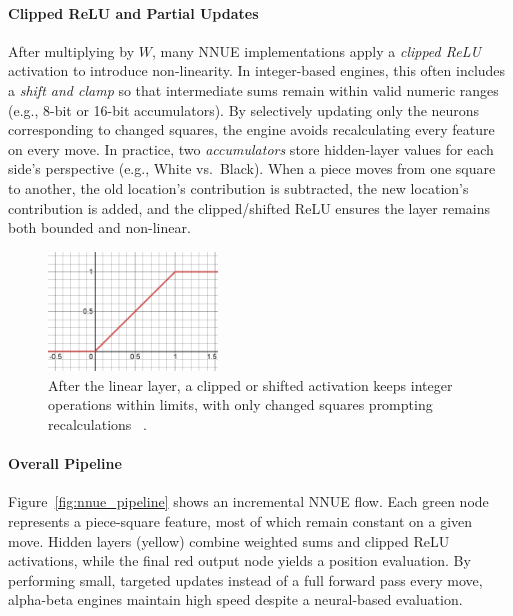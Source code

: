 \documentclass[12pt,a4paper]{article}
\begin{document}
\paragraph{Clipped ReLU and Partial Updates}
After multiplying by \(W\), many NNUE implementations apply a \emph{clipped ReLU} 
activation to introduce non-linearity. In integer-based engines, this often includes 
a \emph{shift and clamp} so that intermediate sums remain within valid numeric ranges 
(e.g., 8-bit or 16-bit accumulators). By selectively updating only the neurons 
corresponding to changed squares, the engine avoids recalculating every feature on 
every move. In practice, two \emph{accumulators} store hidden-layer values for each 
side’s perspective (e.g., White vs.\ Black). When a piece moves from one square to 
another, the old location’s contribution is subtracted, the new location’s contribution 
is added, and the clipped/shifted ReLU ensures the layer remains both bounded and 
non-linear.



\begin{figure}[H]
    \centering
    \includegraphics[width=0.4\textwidth]{figures/clipped_relu.png}
    \caption{After the linear layer, a clipped or shifted activation keeps integer 
    operations within limits, with only changed squares prompting recalculations ~\cite{githubdocs}.}
    \label{fig:mvs}
\end{figure}

\paragraph{Overall Pipeline}
Figure~\ref{fig:nnue_pipeline} shows an incremental NNUE flow. Each green node represents a piece-square feature, most of which remain constant on a given move. Hidden layers (yellow) combine weighted sums and clipped ReLU activations, while the final red output node yields a position evaluation. By performing small, targeted updates instead of a full forward pass every move, alpha-beta engines maintain high speed despite a neural-based evaluation.
\end{document}
